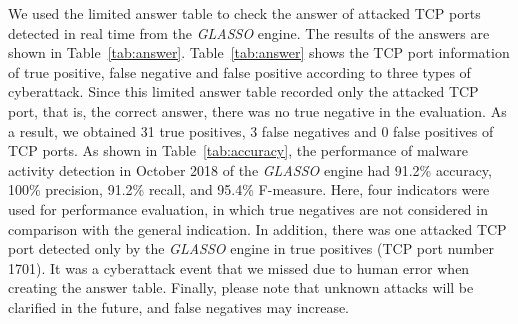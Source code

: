 \documentclass[conference]{IEEEtran}
\begin{document}
We used the limited answer table to check the answer of attacked TCP ports detected in real time from the {\it GLASSO} engine.
The results of the answers are shown in Table~\ref{tab:answer}.
Table~\ref{tab:answer} shows the TCP port information of true positive, false negative and false positive according to three types of cyberattack.
Since this limited answer table recorded only the attacked TCP port, that is, the correct answer, there was no true negative in the evaluation.
As a result, we obtained 31 true positives, 3 false negatives and 0 false positives of TCP ports.
As shown in Table~\ref{tab:accuracy}, the performance of malware activity detection in October 2018 of the {\it GLASSO} engine had 91.2\% accuracy, 100\% precision, 91.2\% recall, and 95.4\% F-measure.
Here, four indicators were used for performance evaluation, in which true negatives are not considered in comparison with the general indication.
In addition, there was one attacked TCP port detected only by the {\it GLASSO} engine in true positives (TCP port number 1701).
It was a cyberattack event that we missed due to human error when creating the answer table.
Finally, please note that unknown attacks will be clarified in the future, and false negatives may increase.
\end{document}
